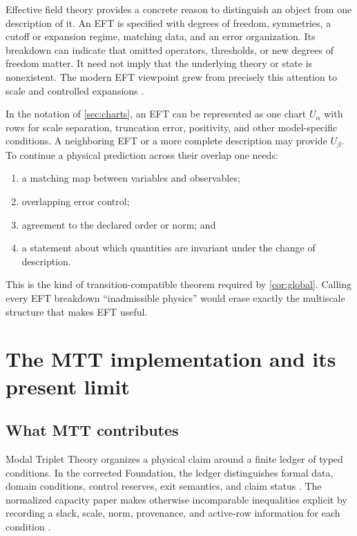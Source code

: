 \documentclass[11pt]{article}
\theoremstyle{definition}
\theoremstyle{remark}
\newcommand{\1}{\mathbf 1}
\newcommand{\MTT}{Modal Triplet Theory}
\begin{document}
Effective field theory provides a concrete reason to distinguish an object
from one description of it.  An EFT is specified with degrees of freedom,
symmetries, a cutoff or expansion regime, matching data, and an error
organization.  Its breakdown can indicate that omitted operators,
thresholds, or new degrees of freedom matter.  It need not imply that the
underlying theory or state is nonexistent.  The modern EFT viewpoint grew
from precisely this attention to scale and controlled expansions
\cite{WeinbergEFT1979,WilsonKogut1974}.

In the notation of \cref{sec:charts}, an EFT can be represented as one
chart \(U_\alpha\) with rows for scale separation, truncation error,
positivity, and other model-specific conditions.  A neighboring EFT or a
more complete description may provide \(U_\beta\).  To continue a physical
prediction across their overlap one needs:
\begin{enumerate}[leftmargin=2em]
\item a matching map between variables and observables;
\item overlapping error control;
\item agreement to the declared order or norm; and
\item a statement about which quantities are invariant under the change
      of description.
\end{enumerate}
This is the kind of transition-compatible theorem required by
\cref{cor:global}.  Calling every EFT breakdown ``inadmissible physics''
would erase exactly the multiscale structure that makes EFT useful.

\section{The MTT implementation and its present limit}
\label{sec:mtt}

\subsection{What MTT contributes}

\MTT{} organizes a physical claim around a finite ledger of typed
conditions.  In the corrected Foundation, the ledger distinguishes formal
data, domain conditions, control reserves, exit semantics, and claim
status \cite{MTTFoundation2026}.  The normalized capacity paper makes
otherwise incomparable inequalities explicit by recording a slack, scale,
norm, provenance, and active-row information for each condition
\cite{CapacityMargin2026}.
\end{document}
